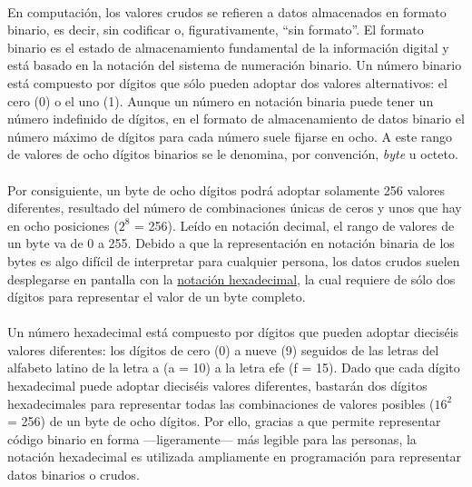 \documentclass{article}[letter, 12pt]
\begin{document}
\paragraph{}En computación, los valores crudos se refieren a datos almacenados en formato binario, es decir, sin codificar o, figurativamente, “sin formato”. El formato binario es el estado de almacenamiento fundamental de la información digital y está basado en la notación del sistema de numeración binario. Un número binario está compuesto por dígitos que sólo pueden adoptar dos valores alternativos: el cero (0) o el uno (1). Aunque un número en notación binaria puede tener un número indefinido de dígitos, en el formato de almacenamiento de datos binario el número máximo de dígitos para cada número suele fijarse en ocho. A este rango de valores de ocho dígitos binarios se le denomina, por convención, \textit{byte} u octeto.\par

\paragraph{}Por consiguiente, un byte de ocho dígitos podrá adoptar solamente 256 valores diferentes, resultado del número de combinaciones únicas de ceros y unos que hay en ocho posiciones ($2^8$ = 256). Leído en notación decimal, el rango de valores de un byte va de 0 a 255. Debido a que la representación en notación binaria de los bytes es algo difícil de interpretar para cualquier persona, los datos crudos suelen desplegarse en pantalla con la \href{https://es.wikipedia.org/wiki/Sistema_hexadecimal}{notación hexadecimal}, la cual requiere de sólo dos dígitos para representar el valor de un byte completo.\par

\paragraph{}Un número hexadecimal está compuesto por dígitos que pueden adoptar dieciséis valores diferentes: los dígitos de cero (0) a nueve (9) seguidos de las letras del alfabeto latino de la letra a (a = 10) a la letra efe (f = 15). Dado que cada dígito hexadecimal puede adoptar dieciséis valores diferentes, bastarán dos dígitos hexadecimales para representar todas las combinaciones de valores posibles ($16^2$ = 256) de un byte de ocho dígitos. Por ello, gracias a que permite representar código binario en forma —ligeramente— más legible para las personas, la notación hexadecimal es utilizada ampliamente en programación para representar datos binarios o crudos.\par
\end{document}
